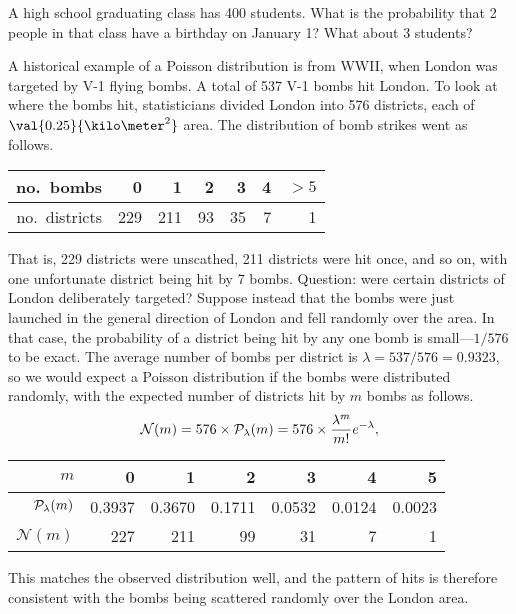 \begin{exercisebox}
A high school graduating class has 400 students.  What is the probability that 2 people in that class have a birthday on January 1?  What about 3 students?
\end{exercisebox}

A historical example of a Poisson distribution is from WWII, when London was targeted by V-1 flying bombs.  A total of 537 V-1 bombs hit London.  To look at where the bombs hit, statisticians divided London into 576 districts, each of $\val{0.25}{\kilo\meter^{2}}$ area.  The distribution of bomb strikes went as follows.
\begin{center}
\begin{tabular}{r|rrrrrr}
no.\ bombs & 0 & 1 & 2 & 3 & 4 & $>5$\\
\hline
no.\ districts & 229 & 211 & 93 & 35 & 7 & 1\\
\end{tabular}
\end{center}
That is, 229 districts were unscathed, 211 districts were hit once, and so on, with one unfortunate district being hit by 7 bombs.  Question: were certain districts of London deliberately targeted? Suppose instead that the bombs were just launched in the general direction of London and fell randomly over the area.  In that case, the probability of a district being hit by any one bomb is small---$1/576$ to be exact.  The average number of bombs per district is $\lambda = 537/576 = 0.9323$, so we would expect a Poisson distribution if the bombs were distributed randomly, with the expected number of districts hit by $m$ bombs as follows.
\[ \mathcal{N}(m) = 576\times \mathcal{P}_{\lambda}(m) = 576\times \frac{\lambda^{m}}{m!}e^{-\lambda}, \]
\begin{center}
\begin{tabular}{r|rrrrrr}
$m$ & 0 & 1 & 2 & 3 & 4 & 5\\
\hline
$\mathcal{P}_{\lambda}(m)$ & 0.3937 & 0.3670 & 0.1711 & 0.0532 & 0.0124 & 0.0023\\
$\mathcal{N}(m)$ & 227 & 211 & 99 & 31 & 7 & 1
\end{tabular}
\end{center}
This matches the observed distribution well, and the pattern of hits is therefore consistent with the bombs being scattered randomly over the London area.

